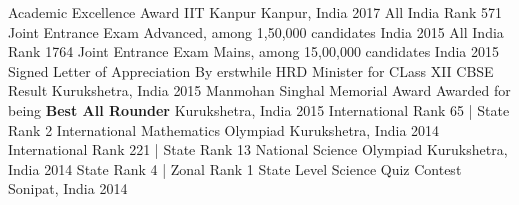 \vspace{-0.3cm}
\begin{cvhonors}
  \cvhonor
    {Academic Excellence Award}
    {IIT Kanpur}
    {Kanpur, India}
    {2017}
  \cvhonor
    {All India Rank 571}
    {Joint Entrance Exam Advanced, among 1,50,000 candidates}
    {India}
    {2015}
  \cvhonor
    {All India Rank 1764}
    {Joint Entrance Exam Mains, among 15,00,000 candidates}
    {India}
    {2015}
    \cvhonor
    {Signed Letter of Appreciation}
    {By erstwhile HRD Minister for CLass XII CBSE Result}
    {Kurukshetra, India}
    {2015}
     \cvhonor
    {Manmohan Singhal Memorial Award}
    {Awarded for being \textbf{Best All Rounder}}
    {Kurukshetra, India}
    {2015}
  \cvhonor
    {International Rank 65 | State Rank 2}
    {International Mathematics Olympiad}
    {Kurukshetra, India}
    {2014}
  \cvhonor
    {International Rank 221 | State Rank 13}
    {National Science Olympiad}
    {Kurukshetra, India}
    {2014}
    \cvhonor
    {State Rank 4 | Zonal Rank 1}
    {State Level Science Quiz Contest}
    {Sonipat, India}
    {2014}
\end{cvhonors}


